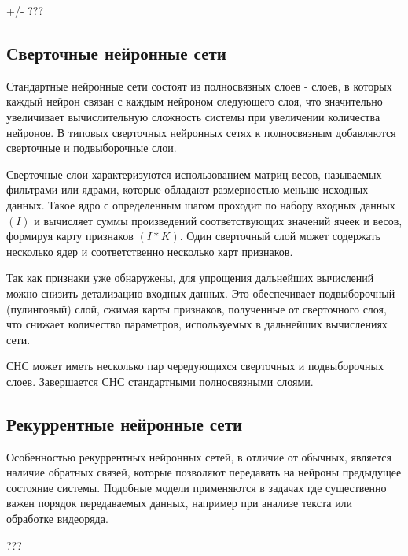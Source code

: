+/- ???

\subsection{Сверточные нейронные сети}
Стандартные нейронные сети состоят из полносвязных слоев - слоев, в которых каждый нейрон связан с каждым нейроном следующего слоя, что значительно увеличивает вычислительную сложность системы при увеличении количества нейронов. 
В типовых сверточных нейронных сетях к полносвязным добавляются сверточные и подвыборочные слои. 

Сверточные слои характеризуются использованием матриц весов, называемых фильтрами или ядрами, которые обладают размерностью меньше исходных данных. Такое ядро с определенным шагом проходит по набору входных данных $(I)$ и вычисляет суммы произведений соответствующих значений ячеек и весов, формируя карту признаков $(I * K)$. Один сверточный слой может содержать несколько ядер и соответственно несколько карт признаков.



Так как признаки уже обнаружены, для упрощения дальнейших вычислений можно снизить детализацию входных данных. Это обеспечивает подвыборочный (пулинговый) слой, сжимая карты признаков, полученные от сверточного слоя, что снижает количество параметров, используемых в дальнейших вычислениях сети. 

СНС может иметь несколько пар чередующихся сверточных и подвыборочных слоев. Завершается СНС стандартными полносвязными слоями.  

\subsection{Рекуррентные нейронные сети}
Особенностью рекуррентных нейронных сетей, в отличие от обычных, является наличие обратных связей, которые позволяют передавать на нейроны предыдущее состояние системы. Подобные модели применяются в задачах где существенно важен порядок передаваемых данных, например при анализе текста или обработке видеоряда.

???
\clearpage